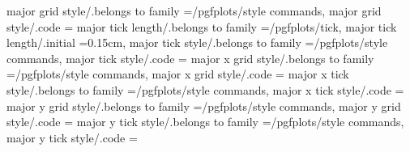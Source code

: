 major grid style/.belongs to family                                =/pgfplots/style commands,                                                                                                          
major grid style/.code                                             ={                                                                                                                                 
major tick length/.belongs to family                               =/pgfplots/tick,                                                                                                                    
major tick length/.initial                                         =0.15cm,                                                                                                                            
major tick style/.belongs to family                                =/pgfplots/style commands,                                                                                                          
major tick style/.code                                             ={                                                                                                                                 
major x grid style/.belongs to family                              =/pgfplots/style commands,                                                                                                          
major x grid style/.code                                           ={                                                                                                                                 
major x tick style/.belongs to family                              =/pgfplots/style commands,                                                                                                          
major x tick style/.code                                           ={                                                                                                                                 
major y grid style/.belongs to family                              =/pgfplots/style commands,                                                                                                          
major y grid style/.code                                           ={                                                                                                                                 
major y tick style/.belongs to family                              =/pgfplots/style commands,                                                                                                          
major y tick style/.code                                           ={                                                                                                                                 
}}}}}}
